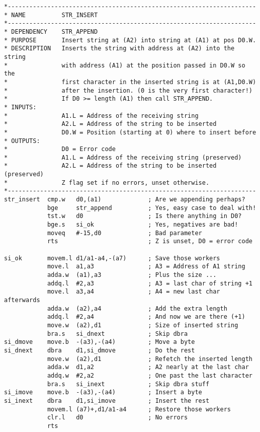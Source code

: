 \begin{lstlisting}[firstnumber=1,caption={STR\_INSERT}]
*---------------------------------------------------------------------
* NAME          STR_INSERT
*---------------------------------------------------------------------
* DEPENDENCY    STR_APPEND
* PURPOSE       Insert string at (A2) into string at (A1) at pos D0.W.
* DESCRIPTION   Inserts the string with address at (A2) into the string
*               with address (A1) at the position passed in D0.W so the
*               first character in the inserted string is at (A1,D0.W)
*               after the insertion. (0 is the very first character!)
*               If D0 >= length (A1) then call STR_APPEND.
* INPUTS:
*               A1.L = Address of the receiving string
*               A2.L = Address of the string to be inserted
*               D0.W = Position (starting at 0) where to insert before
* OUTPUTS:
*               D0 = Error code
*               A1.L = Address of the receiving string (preserved)
*               A2.L = Address of the string to be inserted (preserved)
*               Z flag set if no errors, unset otherwise.
*---------------------------------------------------------------------
str_insert  cmp.w   d0,(a1)             ; Are we appending perhaps?
            bge     str_append          ; Yes, easy case to deal with!
            tst.w   d0                  ; Is there anything in D0?
            bge.s   si_ok               ; Yes, negatives are bad!
            moveq   #-15,d0             ; Bad parameter
            rts                         ; Z is unset, D0 = error code

si_ok       movem.l d1/a1-a4,-(a7)      ; Save those workers
            move.l  a1,a3               ; A3 = Address of A1 string
            adda.w  (a1),a3             ; Plus the size ...
            addq.l  #2,a3               ; A3 = last char of string +1
            move.l  a3,a4               ; A4 = new last char afterwards
            adda.w  (a2),a4             ; Add the extra length
            addq.l  #2,a4               ; And now we are there (+1)
            move.w  (a2),d1             ; Size of inserted string
            bra.s   si_dnext            ; Skip dbra
si_dmove    move.b  -(a3),-(a4)         ; Move a byte
si_dnext    dbra    d1,si_dmove         ; Do the rest
            move.w  (a2),d1             ; Refetch the inserted length
            adda.w  d1,a2               ; A2 nearly at the last char
            addq.w  #2,a2               ; One past the last character
            bra.s   si_inext            ; Skip dbra stuff
si_imove    move.b  -(a3),-(a4)         ; Insert a byte
si_inext    dbra    d1,si_imove         ; Insert the rest
            movem.l (a7)+,d1/a1-a4      ; Restore those workers
            clr.l   d0                  ; No errors
            rts
\end{lstlisting}


